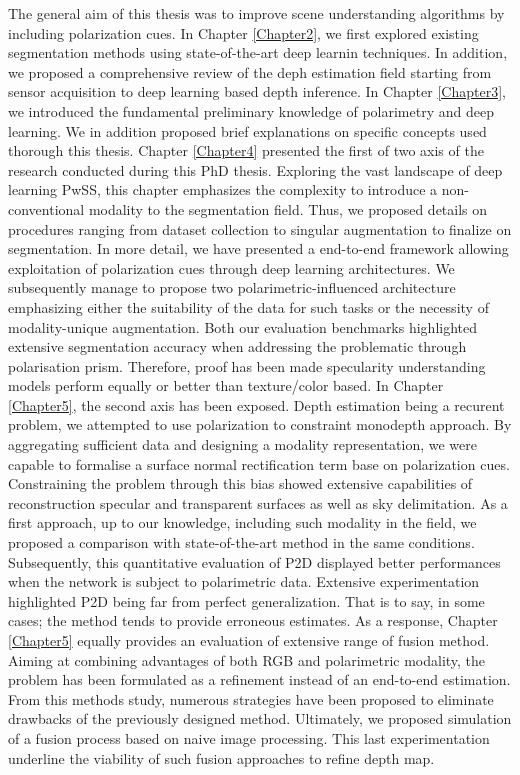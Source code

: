 The general aim of this thesis was to improve scene understanding algorithms by including polarization cues. In Chapter \ref{Chapter2}, we first explored existing segmentation methods using state-of-the-art deep learnin techniques. In addition, we proposed a comprehensive review of the deph estimation field starting from sensor acquisition to deep learning based depth inference.
In Chapter \ref{Chapter3}, we introduced the fundamental preliminary knowledge of polarimetry and deep learning. We in addition proposed brief explanations on specific concepts used thorough this thesis.
Chapter \ref{Chapter4} presented the first of two axis of the research conducted during this PhD thesis. Exploring the vast landscape of deep learning PwSS, this chapter emphasizes the complexity to introduce a non-conventional modality to the segmentation field. Thus, we proposed details on procedures ranging from dataset collection to singular augmentation to finalize on segmentation. In more detail, we have presented a end-to-end framework allowing exploitation of polarization cues through deep learning architectures. We subsequently manage to propose two polarimetric-influenced architecture emphasizing either the suitability of the data for such tasks or the necessity of modality-unique augmentation. Both our evaluation benchmarks highlighted extensive segmentation accuracy when addressing the problematic through polarisation prism. Therefore, proof has been made specularity understanding models perform equally or better than texture/color based.
In Chapter \ref{Chapter5}, the second axis has been exposed. Depth estimation being a recurent problem, we attempted to use polarization to constraint monodepth approach. By aggregating sufficient data and designing a modality representation, we were capable to formalise a surface normal rectification term base on polarization cues. Constraining the problem through this bias showed extensive capabilities of reconstruction specular and transparent surfaces as well as sky delimitation. As a first approach, up to our knowledge, including such modality in the field, we proposed a comparison with state-of-the-art method in the same conditions. Subsequently, this quantitative evaluation of P2D displayed better performances when the network is subject to polarimetric data. 
Extensive experimentation highlighted P2D being far from perfect generalization. That is to say, in some cases; the method tends to provide erroneous estimates. As a response, Chapter \ref{Chapter5} equally provides an evaluation of extensive range of fusion method. Aiming at combining advantages of both RGB and polarimetric modality, the problem has been formulated as a refinement instead of an end-to-end estimation. From this methods study, numerous strategies have been proposed to eliminate drawbacks of the previously designed method. Ultimately, we proposed simulation of a fusion process based on naive image processing. This last experimentation underline the viability of such fusion approaches to refine depth map. 


